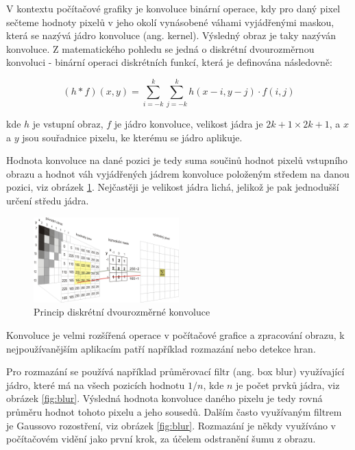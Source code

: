 V kontextu počítačové grafiky je konvoluce binární operace, kdy pro daný pixel
sečteme hodnoty pixelů v jeho okolí vynásobené váhami vyjádřenými maskou, která
se nazývá jádro konvoluce (ang. kernel). Výsledný obraz je taky nazýván
konvoluce. Z matematického pohledu se jedná o diskrétní dvourozměrnou konvoluci
- binární operaci diskrétních funkcí, která je definována následovně:

\begin{equation*}
    (h*f)(x,y)=\sum _{i=-k}^{k}\sum _{j=-k}^{k}h(x-i,y-j)\cdot f(i,j)
\end{equation*}

kde $h$ je vstupní obraz, $f$ je jádro konvoluce, velikost jádra je $2k+1
    \times 2k+1$, a $x$ a $y$ jsou souřadnice pixelu, ke kterému se jádro aplikuje.

Hodnota konvoluce na dané pozici je tedy suma součinů hodnot pixelů vstupního
obrazu a hodnot váh vyjádřených jádrem konvoluce položeným středem na danou
pozici, viz obrázek \ref{fig:convolution}. Nejčastěji je velikost jádra lichá,
jelikož je pak jednodušší určení středu jádra.

\begin{figure}[]
    \centering
    \includegraphics[width=0.5\textwidth]{Figures/convolution.jpg}
    \caption{Princip diskrétní dvourozměrné konvoluce \cite{}}
    \label{fig:convolution}
\end{figure}

Konvoluce je velmi rozšířená operace v počítačové grafice a zpracování obrazu,
k nejpoužívanějším aplikacím patří například rozmazání nebo detekce hran.

Pro rozmazání se používá například průměrovací filtr (ang. box blur)
využívající jádro, které má na všech pozicích hodnotu $1/n$, kde $n$ je počet
prvků jádra, viz obrázek \ref{fig:blur}. Výsledná hodnota konvoluce daného
pixelu je tedy rovná průměru hodnot tohoto pixelu a jeho sousedů. Dalším často
využívaným filtrem je Gaussovo rozostření, viz obrázek \ref{fig:blur}. Rozmazání
je někdy využíváno v počítačovém vidění jako první krok, za účelem odstranění
šumu z obrazu.

